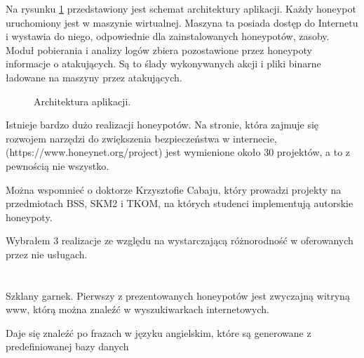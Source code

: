 \documentclass[runningheads,a4paper]{llncs}
\begin{document}
Na rysunku \ref{fig:architektura_fig} przedstawiony jest schemat architektury aplikacji. Każdy honeypot uruchomiony jest w maszynie wirtualnej. Maszyna ta posiada dostęp do Internetu i wystawia do niego, odpowiednie dla zainstalowanych honeypotów, zasoby. Moduł pobierania i analizy logów zbiera pozostawione przez honeypoty informacje o atakujących. Są to ślady wykonywanych akcji i pliki binarne ładowane na maszyny przez atakujących.

\begin{figure}
        \centering
        \caption{Architektura aplikacji.}
        \label{fig:architektura_fig}
\end{figure}

Istnieje bardzo dużo realizacji honeypotów. Na stronie, która zajmuje się rozwojem narzędzi do zwiększenia bezpieczeństwa w internecie, (https://www.honeynet.org/project) jest wymienione około 30 projektów, a to z pewnością nie wszystko.

Można wspomnieć o doktorze Krzysztofie Cabaju, który prowadzi projekty na przedmiotach BSS, SKM2 i TKOM, na których studenci implementują autorskie honeypoty.

Wybrałem 3 realizacje ze względu na wystarczającą różnorodność w oferowanych przez nie usługach.

\section{}

Szklany garnek. Pierwszy z prezentowanych honeypotów jest zwyczajną witryną www, którą można znaleźć w wyszukiwarkach internetowych.

Daje się znaleźć po frazach w języku angielskim, które są generowane z predefiniowanej bazy danych
\end{document}
